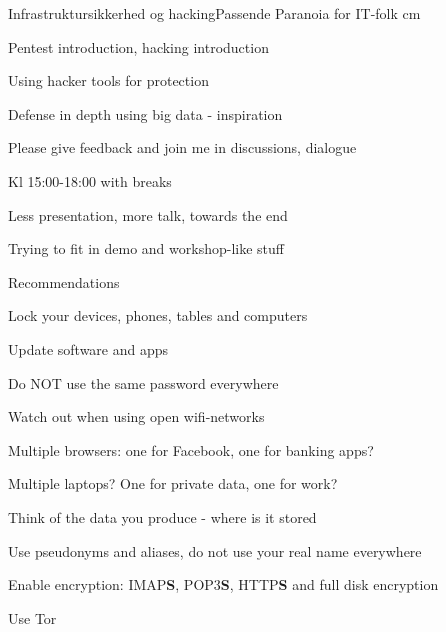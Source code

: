 \documentclass[20pt,landscape,a4paper,footrule]{foils}
\begin{document}
\mytitlepage
{Infrastruktursikkerhed og hacking}{Passende Paranoia for IT-folk}
 cm




\begin{list1}
\item Pentest introduction, hacking introduction
\item Using hacker tools for protection
\item Defense in depth using big data - inspiration
\item Please give feedback and join me in discussions, dialogue \smiley
\end{list1}



\begin{list1}
\item Kl 15:00-18:00 with breaks
\item Less presentation, more talk, towards the end
\end{list1}

\centerline{Trying to fit in demo and workshop-like stuff}



Recommendations 
\begin{list2}
\item Lock your devices, phones, tables and computers
\item Update software and apps
\item Do NOT use the same password everywhere
\item Watch out when using open wifi-networks
\item Multiple browsers: one for Facebook, one for banking apps?
\item Multiple laptops? One for private data, one for work?
\item Think of the data you produce - where is it stored
\item Use pseudonyms and aliases, do not use your real name everywhere
\item Enable encryption: IMAP{\bf S}, POP3{\bf S},
  HTTP{\bf S} and full disk encryption
\item Use Tor 
\end{list2}
\end{document}
